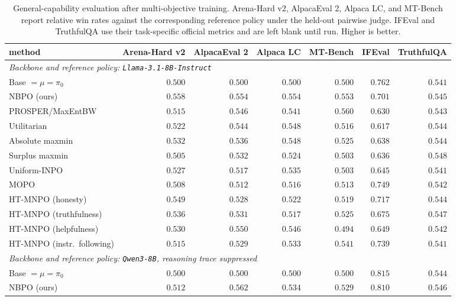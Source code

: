 \documentclass{article}
\theoremstyle{remark}
\theoremstyle{plain}
\newcommand{\NBPO}{\textsc{NBPO}}
\begin{document}
\begin{table}[t]
\centering\scriptsize
\setlength{\tabcolsep}{2.0pt}
\caption{General-capability evaluation after multi-objective training. Arena-Hard v2, AlpacaEval 2, Alpaca LC, and MT-Bench report relative win rates against the corresponding reference policy under the held-out pairwise judge. IFEval and TruthfulQA use their task-specific official metrics and are left blank until run. Higher is better.}
\label{tab:general-benchmark-completion}
\begin{tabular}{lrrrrrr}
\toprule
method & Arena-Hard v2 & AlpacaEval 2 & Alpaca LC & MT-Bench & IFEval & TruthfulQA \\
\midrule
\multicolumn{7}{l}{\textit{Backbone and reference policy: \texttt{Llama-3.1-8B-Instruct}}}\\
Base $=\mu=\pi_0$ & $0.500$ & $0.500$ & $0.500$ & $0.500$ & $0.762$ & $0.541$ \\
\NBPO{} (ours) & $\mathbf{0.558}$ & $\mathbf{0.554}$ & $\mathbf{0.554}$ & $0.553$ & $0.701$ & $0.545$ \\
PROSPER/MaxEntBW & $0.515$ & $0.546$ & $0.541$ & $\mathbf{0.560}$ & $0.630$ & $0.543$ \\
Utilitarian & $0.522$ & $0.544$ & $0.548$ & $0.516$ & $0.617$ & $0.544$ \\
Absolute maxmin & $0.532$ & $0.536$ & $0.548$ & $0.525$ & $0.638$ & $0.544$ \\
Surplus maxmin & $0.505$ & $0.532$ & $0.524$ & $0.503$ & $0.636$ & $0.548$ \\
Uniform-INPO & $0.527$ & $0.517$ & $0.535$ & $0.503$ & $0.645$ & $0.541$ \\
MOPO & $0.508$ & $0.512$ & $0.516$ & $0.513$ & $0.749$ & $0.542$ \\
HT-MNPO (honesty) & $0.549$ & $0.528$ & $0.522$ & $0.519$ & $0.717$ & $0.544$ \\
HT-MNPO (truthfulness) & $0.536$ & $0.531$ & $0.517$ & $0.525$ & $0.675$ & $0.547$ \\
HT-MNPO (helpfulness) & $0.530$ & $0.550$ & $0.546$ & $0.494$ & $0.649$ & $0.542$ \\
HT-MNPO (instr.\ following) & $0.515$ & $0.529$ & $0.533$ & $0.541$ & $0.739$ & $0.541$ \\
\midrule
\multicolumn{7}{l}{\textit{Backbone and reference policy: \texttt{Qwen3-8B}, reasoning trace suppressed}}\\
Base $=\mu=\pi_0$ & $0.500$ & $0.500$ & $0.500$ & $0.500$ & $0.815$ & $0.544$ \\
\NBPO{} (ours) & $\mathbf{0.512}$ & $\mathbf{0.562}$ & $\mathbf{0.534}$ & $\mathbf{0.529}$ & $0.810$ & $0.546$ \\

\end{tabular}
\end{table}
\end{document}
